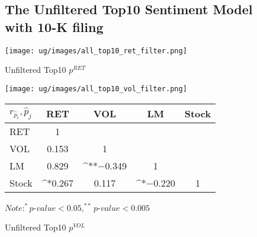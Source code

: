 \documentclass[logo,bsc,singlespacing,parskip]{infthesis}
\begin{document}
\begin{figure}[ht]
\subsection{The Unfiltered Top10 Sentiment Model with 10-K filing}
\label{appendix_all_top10}
\begin{minipage}{0.90\textwidth}
  \centering
  \begin{minipage}{0.5\textwidth}
    \centering
    \texttt{[image: ug/images/all\_top10\_ret\_filter.png]}
    \caption{\small Unfiltered Top10 ${p}^{RET}$}
    \label{fig:all_top10_ret_unfiltered}
  \end{minipage}%
  \begin{minipage}{0.5\textwidth}
    \centering
    \texttt{[image: ug/images/all\_top10\_vol\_filter.png]} 
    \caption{\small Unfiltered Top10 ${p}^{VOL}$}
    \label{fig:all_top10_vol_unfiltered}
  \end{minipage}


    \begin{minipage}[t]{0.9\textwidth}
    \centering
    \begin{tabular}{lcccc}
    \label{tab:all_top10_corr_unfiltered}
    $r_\hat{p}_i,\hat{p}_j$      & RET       & VOL       & LM        & Stock    \\ \hline
    RET    & 1  &   &  &  \\
    VOL    & 0.153   & 1  &  &   \\
    LM    & 0.829 & ^{**}$-$0.349 & 1  &  \\
    Stock  & ^{*}0.267 & 0.117  & ^{*}$-$0.220 & 1  \\ \hline
    \end{tabular}
    \medskip
    $\textit{Note}: ^{*}p$-$value<0.05, ^{**}p$-$value<0.005$
    \end{minipage}
    
\end{minipage}
\end{figure}
\end{document}
